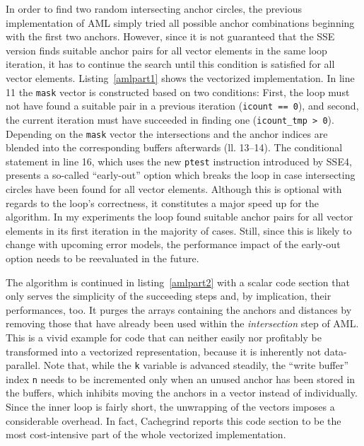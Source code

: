 
In order to find two random intersecting anchor circles, the previous implementation of AML simply tried all possible anchor combinations beginning with the first two anchors. However, since it is not guaranteed that the SSE version finds suitable anchor pairs for all vector elements in the same loop iteration, it has to continue the search until this condition is satisfied for all vector elements. Listing~\ref{amlpart1} shows the vectorized implementation. In line 11 the \texttt{mask} vector is constructed based on two conditions: First, the loop must not have found a suitable pair in a previous iteration (\texttt{icount == 0}), and second, the current iteration must have succeeded in finding one (\texttt{icount\_tmp > 0}). Depending on the \texttt{mask} vector the intersections and the anchor indices are blended into the corresponding buffers afterwards (ll. 13--14). The conditional statement in line 16, which uses the new \texttt{ptest} instruction introduced by SSE4, presents a so-called ``early-out'' option which breaks the loop in case intersecting circles have been found for all vector elements. Although this is optional with regards to the loop's correctness, it constitutes a major speed up for the algorithm. In my experiments the loop found suitable anchor pairs for all vector elements in its first iteration in the majority of cases. Still, since this is likely to change with upcoming error models, the performance impact of the early-out option needs to be reevaluated in the future.


The algorithm is continued in listing~\ref{amlpart2} with a scalar code section that only serves the simplicity of the succeeding steps and, by implication, their performances, too. It purges the arrays containing the anchors and distances by removing those that have already been used within the \emph{intersection} step of AML. This is a vivid example for code that can neither easily nor profitably be transformed into a vectorized representation, because it is inherently not data-parallel. Note that, while the \texttt{k} variable is advanced steadily, the ``write buffer'' index \texttt{n} needs to be incremented only when an unused anchor has been stored in the buffers, which inhibits moving the anchors in a vector instead of individually. Since the inner loop is fairly short, the unwrapping of the vectors imposes a considerable overhead. In fact, Cachegrind reports this code section to be the most cost-intensive part of the whole vectorized implementation.

